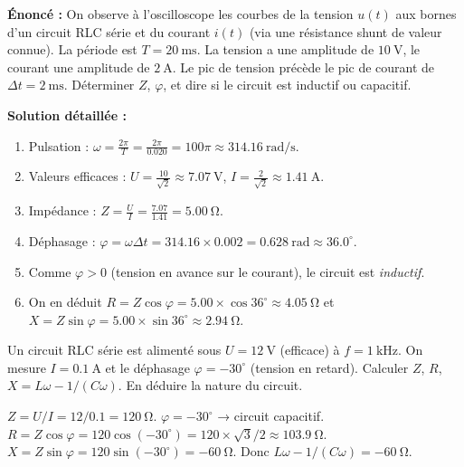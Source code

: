 \documentclass[11pt]{article}
\begin{document}
\begin{exoresolu}
\textbf{Énoncé :} On observe à l'oscilloscope les courbes de la tension $u(t)$ aux bornes d'un circuit RLC série et du courant $i(t)$ (via une résistance shunt de valeur connue). La période est $T=\SI{20}{\milli\second}$. La tension a une amplitude de $\SI{10}{\volt}$, le courant une amplitude de $\SI{2}{\ampere}$. Le pic de tension précède le pic de courant de $\Delta t = \SI{2}{\milli\second}$. Déterminer $Z$, $\varphi$, et dire si le circuit est inductif ou capacitif.

\tcblower

\textbf{Solution détaillée :}
\begin{enumerate}
  \item Pulsation : $\omega = \frac{2\pi}{T} = \frac{2\pi}{0.020} = 100\pi \approx \SI{314.16}{\radian\per\second}$.
  \item Valeurs efficaces : $U = \frac{10}{\sqrt{2}} \approx \SI{7.07}{\volt}$, $I = \frac{2}{\sqrt{2}} \approx \SI{1.41}{\ampere}$.
  \item Impédance : $Z = \frac{U}{I} = \frac{7.07}{1.41} = \SI{5.00}{\ohm}$.
  \item Déphasage : $\varphi = \omega \Delta t = 314.16 \times 0.002 = \SI{0.628}{\radian} \approx 36.0^\circ$.
  \item Comme $\varphi > 0$ (tension en avance sur le courant), le circuit est \emph{inductif}.
  \item On en déduit $R = Z\cos\varphi = 5.00 \times \cos 36^\circ \approx \SI{4.05}{\ohm}$ et $X = Z\sin\varphi = 5.00 \times \sin 36^\circ \approx \SI{2.94}{\ohm}$.
\end{enumerate}
\end{exoresolu}

\begin{exercice}
Un circuit RLC série est alimenté sous $U=\SI{12}{\volt}$ (efficace) à $f=\SI{1}{\kilo\hertz}$. On mesure $I=\SI{0.1}{\ampere}$ et le déphasage $\varphi = -30^\circ$ (tension en retard). Calculer $Z$, $R$, $X = L\omega - 1/(C\omega)$. En déduire la nature du circuit.
\end{exercice}

\begin{corrige}[Exercice 1]
$Z = U/I = 12/0.1 = \SI{120}{\ohm}$. $\varphi = -30^\circ$ → circuit capacitif. $R = Z\cos\varphi = 120\cos(-30^\circ) = 120\times\sqrt{3}/2 \approx \SI{103.9}{\ohm}$. $X = Z\sin\varphi = 120\sin(-30^\circ) = \SI{-60}{\ohm}$. Donc $L\omega - 1/(C\omega) = \SI{-60}{\ohm}$.
\end{corrige}
\end{document}
